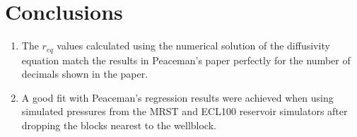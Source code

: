 \section{Conclusions} %
\label{sec:conclusions}
\begin{enumerate}
    \item The $r_{eq}$ values calculated using the numerical solution of the diffusivity equation match the results in Peaceman's paper \cite{Peaceman1978Interpretation} perfectly for the number of decimals shown in the paper.
    \item A good fit with Peaceman's regression results were achieved when using simulated pressures from the MRST and ECL100 reservoir simulators after dropping the blocks nearest to the wellblock.
\end{enumerate}
